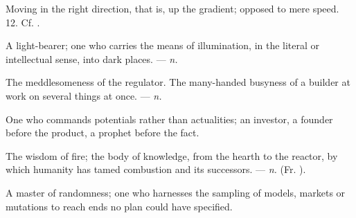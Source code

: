  Moving in the right direction, that is, up the gradient; opposed to mere speed.   12. Cf. .

 A light-bearer; one who carries the means of illumination, in the literal or intellectual sense, into dark places. ---  \textit{n.}

   The meddlesomeness of the regulator.   The many-handed busyness of a builder at work on several things at once. ---  \textit{n.}

 One who commands potentials rather than actualities; an investor, a founder before the product, a prophet before the fact.

 The wisdom of fire; the body of knowledge, from the hearth to the reactor, by which humanity has tamed combustion and its successors. ---  \textit{n.} (Fr. ).

 A master of randomness; one who harnesses the sampling of models, markets or mutations to reach ends no plan could have specified.

